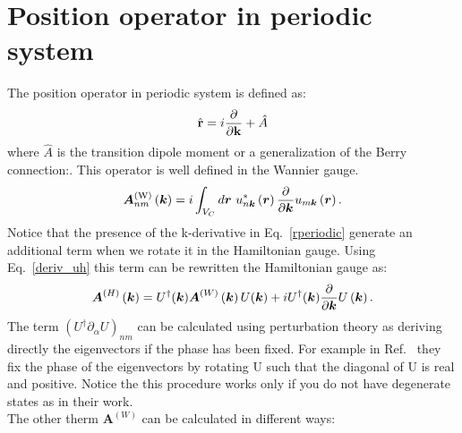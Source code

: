 \documentclass[preprint,showpacs,prb,superscriptaddress,aps,floatfix]{revtex4-1}
\newcommand{\rr}{{\bf r}}
\newcommand{\kk}{{\bf k}}
\newcommand{\be}{\begin{equation}}
\newcommand{\ee}{\end{equation}}
\renewcommand{\[}{\left[}
\renewcommand{\]}{\right]}
\renewcommand{\(}{\left(}
\renewcommand{\)}{\right)}
\def\pw{^{({\rm W})}}
\begin{document}
\section{Position operator in periodic system}
The position operator in periodic system is defined as:\cite{blount1962solid}
\be
\hat \rr = i \frac{\partial}{\partial \kk} + \hat A
\label{rperiodic}
\ee
where $\hat A$ is the transition dipole moment or a generalization of the Berry connection:\cite{silva2019high,wang2006ab}. This operator is well defined in the Wannier gauge.
\be
\boldsymbol{A}\pw_{nm}\left(\boldsymbol{k}\right)=i\int_{V_{C}}d\boldsymbol{r}~u^{*}_{n\boldsymbol{k}}\left(\boldsymbol{r}\right)\frac{\partial}{\partial\boldsymbol{k}}u_{m\boldsymbol{k}}\left(\boldsymbol{r}\right).
\ee
Notice that the presence of the k-derivative in Eq.~\ref{rperiodic} generate an additional term when we rotate it in the Hamiltonian gauge. Using Eq.~\ref{deriv_uh} this term can be rewritten the Hamiltonian gauge as:
\begin{equation}
\boldsymbol{A}^{\left(H\right)}\left(\boldsymbol{k}\right)=U^{\dagger}\text{\ensuremath{\left(\boldsymbol{k}\right)}}\boldsymbol{A}^{\left(W\right)}\left(\boldsymbol{k}\right)U\text{\ensuremath{\left(\boldsymbol{k}\right)}}+iU^{\dagger}\text{\ensuremath{\left(\boldsymbol{k}\right)}}\frac{\partial}{\partial\boldsymbol{k}}U\left(\boldsymbol{k}\right).
\end{equation}
The term $(U^{\dagger}\partial_{\alpha}U)_{nm}$ can be calculated using perturbation theory as deriving directly the eigenvectors if the phase has been fixed. For example in Ref.~ they fix the phase of the eigenvectors by rotating U such that the diagonal of U is real and positive. Notice the this procedure works only if you do not have degenerate states as in their work.\\
The other therm $\boldsymbol{A}^{\left(W\right)}$ can be calculated in different ways: 
\end{document}
